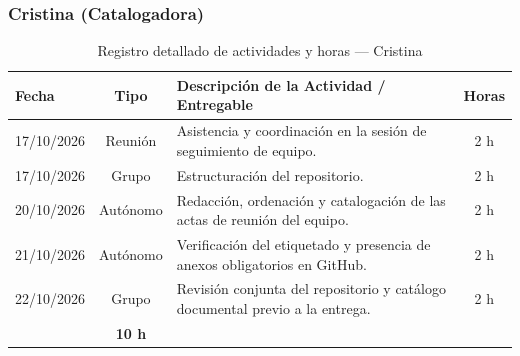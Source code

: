 \subsubsection{Cristina (Catalogadora)}
\begin{table}[H]
\centering
\small
{}
\begin{tabularx}{\textwidth}{l c X c}
\toprule
\rowcolor{verdeApagado}
\textbf{\color{textoOscuro}Fecha} & \textbf{\color{textoOscuro}Tipo} & \textbf{\color{textoOscuro}Descripción de la Actividad / Entregable} & \textbf{\color{textoOscuro}Horas} \\
\midrule
17/10/2026 & Reunión & Asistencia y coordinación en la sesión de seguimiento de equipo. & 2 h \\
17/10/2026 & Grupo & Estructuración del repositorio. & 2 h \\
20/10/2026 & Autónomo & Redacción, ordenación y catalogación de las actas de reunión del equipo. & 2 h \\
21/10/2026 & Autónomo & Verificación del etiquetado y presencia de anexos obligatorios en GitHub. & 2 h \\
22/10/2026 & Grupo & Revisión conjunta del repositorio y catálogo documental previo a la entrega. & 2 h \\
\midrule
\rowcolor{azulclaro!60}
\multicolumn{3}{l}{\textbf{\color{textoOscuro}Total Horas Dedicadas — Cristina:}} & \textbf{\color{textoOscuro}10 h} \\
\bottomrule
\end{tabularx}
\caption{Registro detallado de actividades y horas — Cristina}
\end{table}

